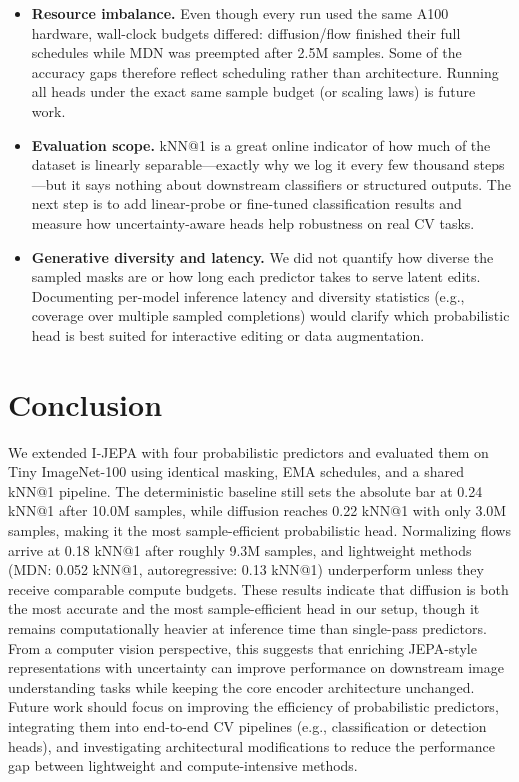 \documentclass[conference]{IEEEtran}
\begin{document}
\begin{itemize}
    \item \textbf{Resource imbalance.} Even though every run used the same A100 hardware, wall-clock budgets differed: diffusion/flow finished their full schedules while MDN was preempted after 2.5M samples. Some of the accuracy gaps therefore reflect scheduling rather than architecture. Running all heads under the exact same sample budget (or scaling laws) is future work.
    \item \textbf{Evaluation scope.} kNN@1 is a great online indicator of how much of the dataset is linearly separable—exactly why we log it every few thousand steps—but it says nothing about downstream classifiers or structured outputs. The next step is to add linear-probe or fine-tuned classification results and measure how uncertainty-aware heads help robustness on real CV tasks.
    \item \textbf{Generative diversity and latency.} We did not quantify how diverse the sampled masks are or how long each predictor takes to serve latent edits. Documenting per-model inference latency and diversity statistics (e.g., coverage over multiple sampled completions) would clarify which probabilistic head is best suited for interactive editing or data augmentation.
\end{itemize}

\section{Conclusion}
We extended I-JEPA with four probabilistic predictors and evaluated them on Tiny ImageNet-100 using identical masking, EMA schedules, and a shared kNN@1 pipeline.
The deterministic baseline still sets the absolute bar at 0.24 kNN@1 after 10.0M samples, while diffusion reaches 0.22 kNN@1 with only 3.0M samples, making it the most sample-efficient probabilistic head.
Normalizing flows arrive at 0.18 kNN@1 after roughly 9.3M samples, and lightweight methods (MDN: 0.052 kNN@1, autoregressive: 0.13 kNN@1) underperform unless they receive comparable compute budgets.
These results indicate that diffusion is both the most accurate and the most sample-efficient head in our setup, though it remains computationally heavier at inference time than single-pass predictors.
From a computer vision perspective, this suggests that enriching JEPA-style representations with uncertainty can improve performance on downstream image understanding tasks while keeping the core encoder architecture unchanged.
Future work should focus on improving the efficiency of probabilistic predictors, integrating them into end-to-end CV pipelines (e.g., classification or detection heads), and investigating architectural modifications to reduce the performance gap between lightweight and compute-intensive methods.



\end{document}
